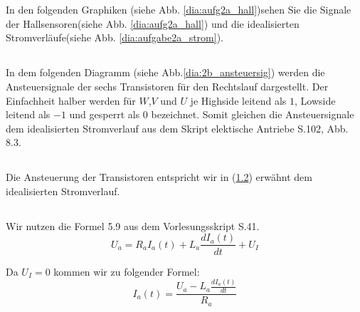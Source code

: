 %
%
%
%
\chapter{}\label{ex:aufg2}
%
%
\section{}\label{sec:aufg2a}
%
In den folgenden Graphiken (siehe Abb. \ref{dia:aufg2a_hall})sehen Sie die Signale der Hallsensoren(siehe Abb. \ref{dia:aufg2a_hall}) und die idealisierten Stromverläufe(siehe Abb. \ref{dia:aufgabe2a_strom}).


\newpage
%
%
%
\section{}\label{sec:aufg2b}
%
In dem folgenden Diagramm (siehe Abb.\ref{dia:2b_ansteuersig}) werden die Ansteuersignale der sechs Transistoren für den Rechtslauf dargestellt. Der Einfachheit halber werden für $W$,$V$ und $U$ je Highside leitend als $1$, Lowside leitend als $-1$ und gesperrt als $0$ bezeichnet. Somit gleichen die Ansteuersignale dem idealisierten Stromverlauf aus dem Skript elektische Antriebe S.102, Abb. 8.3.

%
\section{}\label{sec:aufg2c}
%
Die Ansteuerung der Transistoren entspricht wir in (\ref{sec:aufg2b}) erwähnt  dem idealisierten Stromverlauf.

%
\newpage
\section{}\label{sec:aufg2d}
%
Wir nutzen die Formel 5.9 aus dem Vorlesungsskript S.41.
\begin{equation}
	U_a = R_a I_a(t) + L_a \frac{dI_a(t)}{dt} + U_I
	\label{for:formel1}
\end{equation}

Da $U_I = 0$ kommen wir zu folgender Formel:
\begin{equation}
	I_a(t) = \frac{U_a - L_a \frac{dI_a(t)}{dt}}{R_a}
	\label{for:formel2}
\end{equation}

